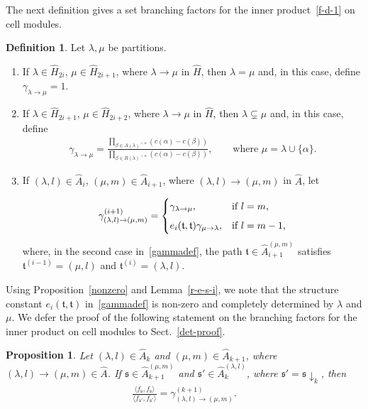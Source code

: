 \documentclass[11pt,a4paper,reqno,svgnames]{amsart}
\theoremstyle{plain}
\newtheorem{proposition}[theorem]{Proposition}
\theoremstyle{definition}
\newtheorem{definition}[theorem]{Definition}
\numberwithin{equation}{section}
\begin{document}
The next definition gives a set branching factors for the inner product~\eqref{f-d-1} on cell modules. 
\begin{definition}
Let $\lambda,\mu$ be partitions.
\begin{enumerate}[label=(\arabic{*}), ref=\arabic{*},leftmargin=0pt,itemindent=1.5em]
\item If $\lambda\in\widehat{H}_{2i}$, $\mu\in\widehat{H}_{2i+1}$, where $\lambda\to\mu$ in $\widehat{H}$, then $\lambda=\mu$ and, in this case, define $\gamma_{\lambda\to\mu}=1$. 
\item If $\lambda\in\widehat{H}_{2i+1}$, $\mu\in\widehat{H}_{2i+2}$, where $\lambda\to\mu$ in $\widehat{H}$, then $\lambda\subsetneq\mu$ and, in this case, define 
\begin{align*}
\gamma_{\lambda\to\mu}= 
{\displaystyle\frac{\prod_{\beta\in A(\lambda)^{<\alpha}}(c(\alpha)-c(\beta))}{\prod_{\beta\in R(\lambda)^{<\alpha}}(c(\alpha)-c(\beta))}}, \qquad\text{where $\mu=\lambda\cup \lbrace \alpha\rbrace$.}
\end{align*}
\item If $(\lambda,l)\in\hat{A}_i$, $(\mu,m)\in\hat{A}_{i+1}$, where $(\lambda,l)\to(\mu,m)$ in $\hat{A}$, let 

\begin{align}\label{gammadef}
\gamma^{(i+1)}_{(\lambda,l)\to(\mu,m)}=
\begin{cases}
\gamma_{\lambda\to\mu}, &\text{if $l=m$,}\vspace{0.5em}\\
e_{i}(\mathfrak{t,t})\gamma_{\mu\to\lambda}, &\text{if $l=m-1$,}
\end{cases}
\end{align} 
where, in the second case in~\eqref{gammadef}, the path $\mathfrak{t}\in\hat{A}_{i+1}^{(\mu,m)}$ satisfies $\mathfrak{t}^{(i-1)}=(\mu,l)$ and $\mathfrak{t}^{(i)}=(\lambda,l)$. 
\end{enumerate}
\end{definition}
Using Proposition~\ref{nonzero} and Lemma~\ref{r-e-s-i}, we note that the structure constant $e_{i}(\mathfrak{t},\mathfrak{t})$  in~\eqref{gammadef} is non-zero and completely determined by $\lambda$ and $\mu$. We defer the proof of the following statement on the branching factors for the inner product on cell modules to Sect.~\ref{det-proof}.
\begin{proposition}\label{branching}
Let $(\lambda,l)\in\hat{A}_{k}$ and $(\mu,m)\in\hat{A}_{k+1}$, where $(\lambda,l)\to(\mu,m)\in\hat{A}$. If  $\mathfrak{s}\in\hat{A}_{k+1}^{(\mu,m)}$ and  $\mathfrak{s}'\in\hat{A}_{k}^{(\lambda,l)}$, where $\mathfrak{s}'=\mathfrak{s}\downarrow_{k}$, then  
\begin{align}\label{quotient}
\frac{\langle f_\mathfrak{s},f_\mathfrak{s}\rangle}{ \langle f_\mathfrak{s'},f_\mathfrak{s'}\rangle} =\gamma_{(\lambda,l)\to(\mu,m)}^{(k+1)}.
\end{align}
\end{proposition}
\end{document}
